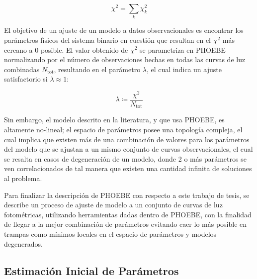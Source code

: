 \begin{eqfloat}[!ht]
	\centering
	\begin{equation}
		\chi^2 = \sum_{k}{\chi_{k}^{2}}
	\end{equation}
	\blankcaption
	\vspace{-0.4em}
	\label{ecuacionChi2}
\end{eqfloat}

El objetivo de un ajuste de un modelo a datos observacionales es encontrar los
parámetros físicos del sistema binario en cuestión que resultan en el $\chi^{2}$
más cercano a 0 posible. El valor obtenido de $\chi^2$ se parametriza en PHOEBE
normalizando por el número de observaciones hechas en todas las curvas de luz
combinadas $N_{\mathrm{tot}}$, resultando en el parámetro $\lambda$, el cual
indica un ajuste satisfactorio si $\lambda \approx 1$:

\begin{eqfloat}
	\centering
	\begin{equation}
		\lambda \coloneq \frac{\chi^2}{N_{\textrm{tot}}}
	\end{equation}
	\blankcaption
	\label{ecuacionLambdaCostoPhoebe}
\end{eqfloat}

Sin embargo, el modelo descrito en la literatura, y que
usa PHOEBE, es altamente no-lineal; el espacio de parámetros posee una topología
compleja, el cual implica que existen más de una combinación de valores para los
parámetros del modelo que se ajustan a un mismo conjunto de curvas
observacionales, el cual se resalta en casos de degeneración de un modelo, donde
2 o más parámetros se ven correlacionados de tal manera que existen una cantidad
infinita de soluciones al problema. 

Para finalizar la descripción de PHOEBE con
respecto a este trabajo de tesis, se describe un proceso de ajuste de modelo a
un conjunto de curvas de luz fotométricas, utilizando herramientas dadas dentro
de PHOEBE, con la finalidad de llegar a la mejor combinación de parámetros
evitando caer lo más posible en trampas como mínimos locales en el espacio de
parámetros y modelos degenerados.

\subsection{Estimación Inicial de Parámetros}

